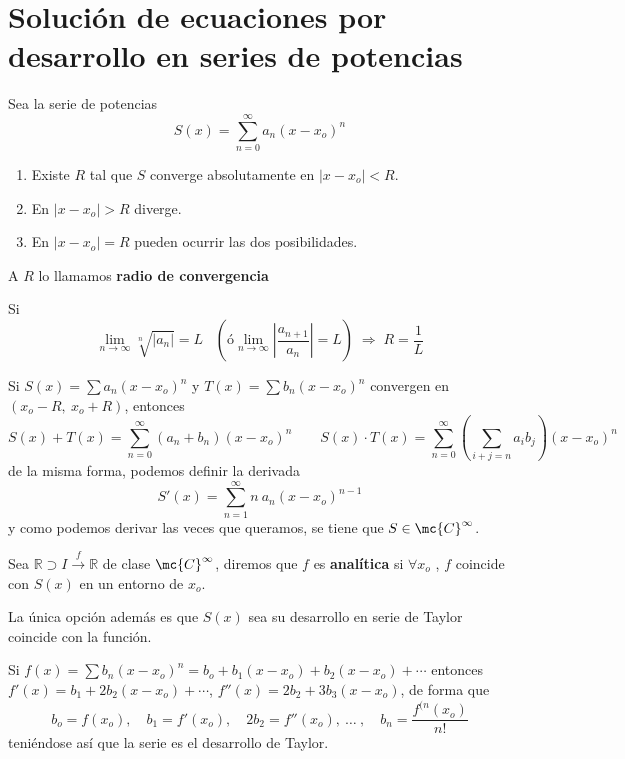 \section{Solución de ecuaciones por desarrollo en series de potencias}

\begin{prop}
    Sea la serie de potencias
    $$S(x)=\sum_{n=0}^{\infty} a_n (x-x_o)^n$$
    \begin{enumerate}
        \item Existe $R$ tal que $S$ converge absolutamente en $|x-x_o| < R$. 
        \item En $|x-x_o|> R$ diverge.
        \item En $|x-x_o|=R$ pueden ocurrir las dos posibilidades.
    \end{enumerate}
\end{prop}
\begin{defi}
    A $R$ lo llamamos \textbf{radio de convergencia}
\end{defi}
\begin{prop}
    Si 
    $$\lim_{n \to \infty} \sqrt[n]{|a_n|}=L \; \; \; \left(ó \lim_{n \to \infty}\left| \dfrac{a_{n+1}}{a_n}\right|=L \right) \; \Rightarrow \; R=\dfrac{1}{L}$$
\end{prop}
\begin{propi}
Si $\displaystyle S(x)=\sum a_n(x-x_o)^n$ y $\displaystyle T(x)=\sum b_n(x-x_o)^n$ convergen en $(x_o-R, \: x_o+R)$, entonces
$$S(x)+T(x)=\sum_{n=0}^{\infty} (a_n+b_n)(x-x_o)^n \qquad S(x) \cdot T(x)=\sum_{n=0}^{\infty} \left(\sum_{i+j=n} a_ib_j\right)(x-x_o)^n$$
de la misma forma, podemos definir la derivada
$$S'(x)=\sum_{n=1}^{\infty}n \: a_n (x-x_o)^{n-1}$$
y como podemos derivar las veces que queramos, se tiene que $S \in \mc{C}^{\infty}$.
\end{propi}
\begin{defi}
Sea $\mathbb R \supset I \overset{f}{\longrightarrow} \mathbb R$ de clase $\mc{C}^{\infty}$, diremos que $f$ es \textbf{analítica} si $\forall x_o$ , $f$ coincide con $S(x)$ en un entorno de $x_o$. 
\end{defi}
\begin{prop}
    La única opción además es que $S(x)$ sea su desarrollo en serie de Taylor coincide con la función.
\end{prop}
\begin{dem}
    Si $f(x)=\sum b_n(x-x_o)^n=b_o+b_1(x-x_o)+b_2(x-x_o)+\cdots$
    entonces $f'(x)=b_1+2b_2(x-x_o)+\cdots $, $f''(x)=2b_2+3b_3(x-x_o)$, de forma que $$b_o=f(x_o), \quad b_1=f'(x_o), \quad 2b_2=f''(x_o), \: \ldots \: , \quad b_n=\frac{f^{(n}(x_o)}{n!} $$ teniéndose así que la serie es el desarrollo de Taylor.
\end{dem}
